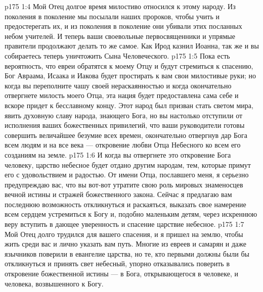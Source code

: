 \vs p175 1:4 Мой Отец долгое время милостиво относился к этому народу. Из поколения в поколение мы посылали наших пророков, чтобы учить и предостерегать их, и из поколения в поколение они убивали этих посланных небом учителей. И теперь ваши своевольные первосвященники и упрямые правители продолжают делать то же самое. Как Ирод казнил Иоанна, так же и вы собираетесь теперь уничтожить Сына Человеческого.
\vs p175 1:5 Пока есть вероятность, что евреи обратятся к моему Отцу и будут стремиться к спасению, Бог Авраама, Исаака и Иакова будет простирать к вам свои милостивые руки; но когда вы переполните чашу своей нераскаянностью и когда окончательно отвергнете милость моего Отца, эта нация будет предоставлена сама себе и вскоре придет к бесславному концу. Этот народ был призван стать светом мира, явить духовную славу народа, знающего Бога, но вы настолько отступили от исполнения ваших божественных привилегий, что ваши руководители готовы совершить величайшее безумие всех времен, окончательно отвергнув дар Бога всем людям и на все века --- откровение любви Отца Небесного ко всем его созданиям на земле.
\vs p175 1:6 И когда вы отвергнете это откровение Бога человеку, царство небесное будет отдано другим народам, тем, которые примут его с удовольствием и радостью. От имени Отца, пославшего меня, я серьезно предупреждаю вас, что вы вот\hyp{}вот утратите свою роль мировых знаменосцев вечной истины и стражей божественного закона. Сейчас я предлагаю вам последнюю возможность откликнуться и раскаяться, выказать свое намерение всем сердцем устремиться к Богу и, подобно маленьким детям, через искреннюю веру вступить в дающее уверенность и спасение царствие небесное.
\vs p175 1:7 Мой Отец долго трудился для вашего спасения, и я пришел на землю, чтобы жить среди вас и лично указать вам путь. Многие из евреев и самарян и даже язычников поверили в евангелие царства, но те, кто первыми должны были бы откликнуться и принять свет небесный, упорно отказывались поверить в откровение божественной истины --- в Бога, открывающегося в человеке, и человека, возвышенного к Богу.
